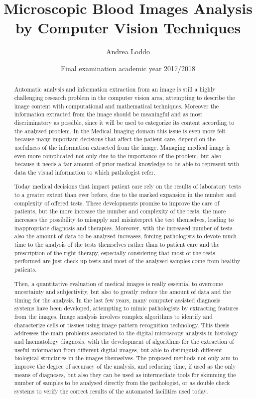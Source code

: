 \documentclass[final,a4paper,12pt,english]{UnicaPhdThesis3}
\title{Microscopic Blood Images Analysis by Computer Vision Techniques}
\author{Andrea Loddo}
\date{Final examination academic year 2017/2018}
\begin{document}
\maketitle

\begin{abstract} %
Automatic analysis and information extraction from an image is still a highly challenging research problem in the computer vision area, attempting to describe the image content with computational and mathematical techniques. Moreover the information extracted from the image should be meaningful and as most discriminatory as possible, since it will be used to categorize its content according to the analysed problem. In the Medical Imaging domain this issue is even more felt because many important decisions that affect the patient care, depend on the usefulness of the information extracted from the image. Managing medical image is even more complicated not only due to the importance of the problem, but also because it needs a fair amount of prior medical knowledge to be able to represent with data the visual information to which pathologist refer. 

Today medical decisions that impact patient care rely on the results of laboratory tests to a greater extent than ever before, due to the marked expansion in the number and complexity of offered tests. These developments promise to improve the care of patients, but the more increase the number and complexity of the tests, the more increases the possibility to misapply and misinterpret the test themselves, leading to inappropriate diagnosis and therapies.  Moreover, with the increased number of tests also the amount of data to be analysed increases, forcing pathologists to devote much time to the analysis of the tests themselves rather than to patient care and the prescription of the right therapy, especially considering that most of the tests performed are just check up tests and most of the analysed samples come from healthy patients.

Then, a quantitative evaluation of medical images is really essential to overcome uncertainty and subjectivity, but also to greatly reduce the amount of data and the timing for the analysis. In the last few years, many computer assisted diagnosis systems have been developed, attempting to mimic pathologists by extracting features from the images. Image analysis involves complex algorithms to identify and characterize cells or tissues using image pattern recognition technology. This thesis addresses the main problems associated to the digital microscopy analysis in histology and haematology diagnosis, with the development of algorithms for the extraction of useful information from different digital images, but able to distinguish different biological structures in the images themselves. The proposed methods not only aim to improve the degree of accuracy of the analysis, and reducing time, if used as the only means of diagnoses, but also they can be used as intermediate tools for skimming the number of samples to be analysed directly from the pathologist, or as double check systems to verify the correct results of the automated facilities used today.
\end{abstract}
\end{document}
